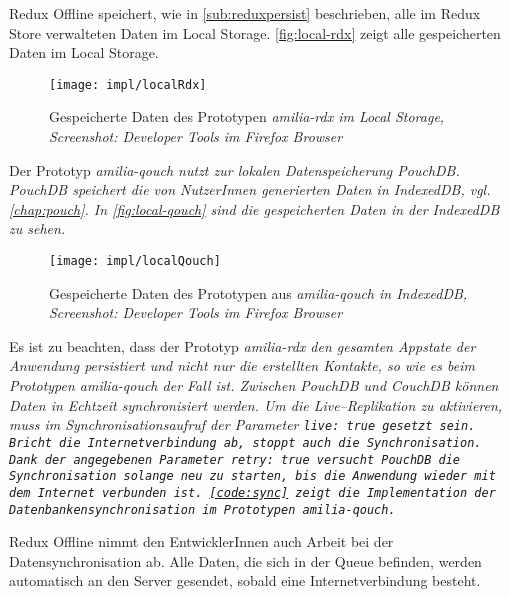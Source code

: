 %
%
Redux Offline speichert, wie in \autoref{sub:reduxpersist} beschrieben, alle im Redux Store verwalteten Daten im Local Storage.
\autoref{fig:local-rdx} zeigt alle gespeicherten Daten im Local Storage.
%
\begin{figure}[H]
  \centering
  \texttt{[image: impl/localRdx]}
  \grayRule
  \caption[Gespeicherte Daten im Local Storage]{Gespeicherte Daten des Prototypen \it{amilia-rdx} im Local Storage,\\Screenshot: Developer Tools im Firefox Browser}
  \label{fig:local-rdx}
\end{figure}
% 
Der Prototyp \it{amilia-qouch} nutzt zur lokalen Datenspeicherung PouchDB.
PouchDB speichert die von NutzerInnen generierten Daten in IndexedDB, vgl. \autoref{chap:pouch}. In \autoref{fig:local-qouch} sind die gespeicherten Daten in der IndexedDB zu sehen.
%
\begin{figure}[H]
  \centering
  \texttt{[image: impl/localQouch]}
  \grayRule
  \caption[Gespeicherte Daten in IndexedDB]{Gespeicherte Daten des Prototypen aus \it{amilia-qouch} in IndexedDB,\\Screenshot: Developer Tools im Firefox Browser}
  \label{fig:local-qouch}
\end{figure}
%
Es ist zu beachten, dass der Prototyp \it{amilia-rdx} den gesamten \gls{App}state der Anwendung persistiert und nicht nur die erstellten Kontakte, so wie es beim Prototypen \it{amilia-qouch} der Fall ist.
%
%
Zwischen PouchDB und CouchDB können Daten in Echtzeit synchronisiert werden.
Um die Live--Replikation zu aktivieren, muss im Synchronisationsaufruf der Parameter \tt{live: true} gesetzt sein.
Bricht die Internetverbindung ab, stoppt auch die Synchronisation.
Dank der angegebenen Parameter \tt{retry: true} versucht PouchDB die Synchronisation solange neu zu starten, bis die Anwendung wieder mit dem Internet verbunden ist. \autoref{code:sync} zeigt die Implementation der Datenbankensynchronisation im Prototypen \it{amilia-qouch}.
%
\begin{center}
  
\end{center}
% 
Redux Offline nimmt den EntwicklerInnen auch Arbeit bei der Datensynchronisation ab.
Alle Daten, die sich in der Queue befinden, werden automatisch an den Server gesendet, sobald eine Internetverbindung besteht.
